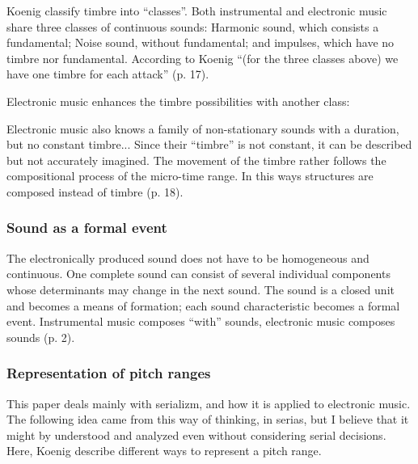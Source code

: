 \documentclass[a4paper,11pt]{article}
\newenvironment{MyShadequote}[1][]
    {\begin{mdframed}[style=MyShadeQuoteStyle,#1]}
    {\end{mdframed}}
\begin{document}
Koenig classify timbre into ``classes''.
Both instrumental and electronic music share three classes of continuous sounds:
Harmonic sound, which consists a fundamental; Noise sound, without fundamental; and impulses, which have no timbre nor fundamental.
According to Koenig ``(for the three classes above) we have one timbre for each attack'' (p. 17).

Electronic music enhances the timbre possibilities with another class:

\begin{MyShadequote}
 Electronic music also knows a family of non-stationary sounds with a duration, but no constant timbre...
 Since their ``timbre'' is not constant, it can be described but not accurately imagined.
 The movement of the timbre rather follows the compositional process of the micro-time range.
 In this ways structures are composed instead of timbre (p. 18).
\end{MyShadequote}

\subsubsection{Sound as a formal event}
\label{subs:koenig:event}

\begin{MyShadequote}
  The electronically produced sound does not have to be homogeneous and continuous.
  One complete sound can consist of several individual components whose determinants may change in the next sound.
  The sound is a closed unit and becomes a means of formation;
  each sound characteristic becomes a formal event.
  Instrumental music composes ``with'' sounds, electronic music composes sounds (p. 2).
\end{MyShadequote}

\subsubsection{Representation of pitch ranges}
\label{subs:koenig:pitch_ranges}

This paper deals mainly with serializm, and how it is applied to electronic music.
The following idea came from this way of thinking, in serias, but I believe that it might by understood and analyzed even without considering serial decisions.
Here, Koenig describe different ways to represent a pitch range.
\end{document}
